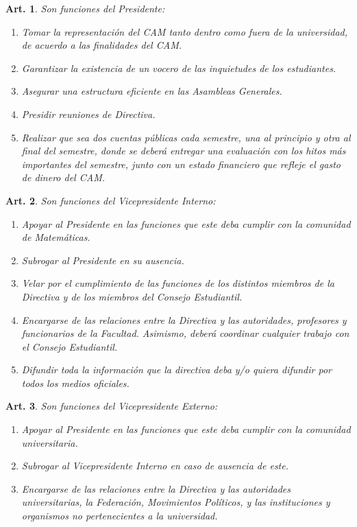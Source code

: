 \documentclass[letterpaper,11pt]{article}
\theoremstyle{plain}
\newtheorem{art}{Art.} %
\begin{document}
\begin{art}\label{funcionesPresidente}
	Son funciones del Presidente:
	\begin{enumerate}
		\item Tomar la representación del CAM tanto dentro como fuera de la universidad, de acuerdo a las finalidades del CAM.
		\item Garantizar la existencia de un vocero de las inquietudes de los estudiantes.
		\item Asegurar una estructura eficiente en las Asambleas Generales.
		\item Presidir reuniones de Directiva.
		\item Realizar que sea dos cuentas públicas cada semestre, una al principio y otra al final del semestre, donde se deberá entregar una evaluación con los hitos más importantes del semestre, junto con un estado financiero que refleje el gasto de dinero del CAM.
	\end{enumerate}
\end{art}

\begin{art}\label{funcionesVicepresidenteInterno}
	Son funciones del Vicepresidente Interno:
	\begin{enumerate}
		\item Apoyar al Presidente en las funciones que este deba cumplir con la comunidad de Matemáticas.
		\item Subrogar al Presidente en su ausencia.
		\item Velar por el cumplimiento de las funciones de los distintos miembros de la Directiva y de los miembros del Consejo Estudiantil.
		\item Encargarse de las relaciones entre la Directiva y las autoridades, profesores y funcionarios de la Facultad. Asimismo, deberá coordinar cualquier trabajo con el Consejo Estudiantil.%
		\item Difundir toda la información que la directiva deba y/o quiera difundir por todos los medios oficiales.
	\end{enumerate}
\end{art}

\begin{art}\label{funcionesVicepresidenteExterno}
	Son funciones del Vicepresidente Externo:
	\begin{enumerate}
		\item Apoyar al Presidente en las funciones que este deba cumplir con la comunidad universitaria.
		\item Subrogar al Vicepresidente Interno en caso de ausencia de este.
		\item Encargarse de las relaciones entre la Directiva y las autoridades universitarias, la Federación, Movimientos Políticos, y las instituciones y organismos no pertenecientes a la universidad.%
	\end{enumerate}
\end{art}
\end{document}

